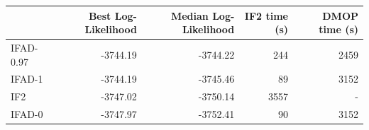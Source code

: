 \begin{tabular}{lrrrr}
\toprule
 & Best Log-Likelihood & Median Log-Likelihood & IF2 time (s) & DMOP time (s) \\
\midrule
IFAD-0.97 & -3744.19 & -3744.22 & 244 & 2459 \\
IFAD-1 & -3744.19 & -3745.46 & 89 & 3152 \\
IF2 & -3747.02 & -3750.14 & 3557 & - \\
IFAD-0 & -3747.97 & -3752.41 & 90 & 3152 \\
\bottomrule
\end{tabular}
